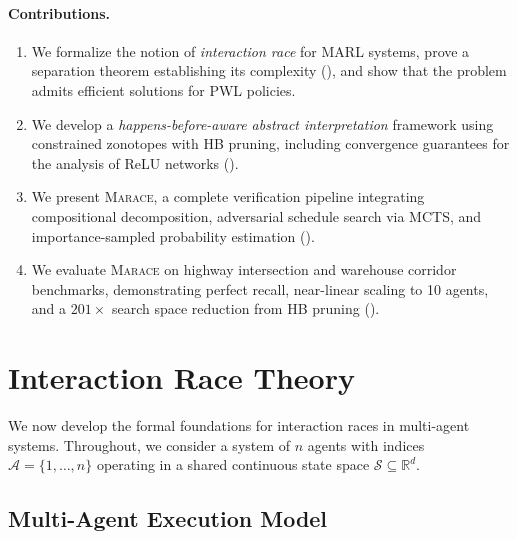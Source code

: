 \documentclass[11pt]{article}
\newcommand{\R}{\mathbb{R}}
\newcommand{\calS}{\mathcal{S}}
\newcommand{\calA}{\mathcal{A}}
\newcommand{\marace}{\textsc{Marace}}
\begin{document}
\paragraph{Contributions.}
\begin{enumerate}[leftmargin=*,nosep]
\item We formalize the notion of \emph{interaction race} for MARL systems,
prove a separation theorem establishing its complexity (),
and show that the problem admits efficient solutions for PWL policies.

\item We develop a \emph{happens-before-aware abstract interpretation} framework
using constrained zonotopes with HB pruning, including convergence guarantees
for the analysis of ReLU networks ().

\item We present \marace{}, a complete verification pipeline integrating
compositional decomposition, adversarial schedule search via MCTS, and
importance-sampled probability estimation ().

\item We evaluate \marace{} on highway intersection and warehouse corridor
benchmarks, demonstrating perfect recall, near-linear scaling to 10 agents,
and a $201\times$ search space reduction from HB pruning ().
\end{enumerate}

\section{Interaction Race Theory}
\label{sec:theory}

We now develop the formal foundations for interaction races in multi-agent
systems. Throughout, we consider a system of $n$ agents with indices
$\calA = \{1,\ldots,n\}$ operating in a shared continuous state space
$\calS \subseteq \R^d$.

\subsection{Multi-Agent Execution Model}
\end{document}
